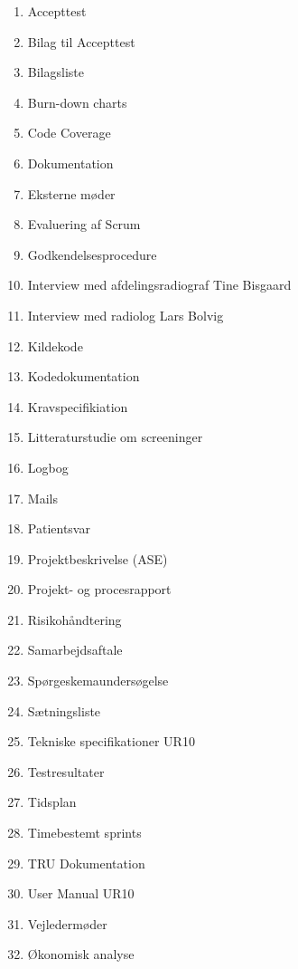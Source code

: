 \begin{enumerate}
\item Accepttest 					 					\label{Accepttest}
\item Bilag til Accepttest								\label{BilagAccepttest}
\item Bilagsliste								\label{Bilagsliste}
\item Burn-down charts									\label{BurnDown}
\item Code Coverage 									\label{Code Coverage}
\item Dokumentation 							\label{Udviklingsdokument}
\item Eksterne møder									\label{Eksterne moder} 
\item Evaluering af Scrum 								\label{Evaluering Scrum} 
\item Godkendelsesprocedure 							\label{Godkendelsesprocedure}
\item Interview med afdelingsradiograf Tine Bisgaard 	\label{Tine}
\item Interview med radiolog Lars Bolvig  				\label{Telefoninterview}
\item Kildekode											\label{Kildekode}
\item Kodedokumentation 								\label{Kodedokumentation} 
\item Kravspecifikiation 								\label{Kravspecifikation}
\item Litteraturstudie om screeninger						\label{Litteraturstudie}
\item Logbog											\label{Logbog}
\item Mails												\label{Mails}
\item Patientsvar										\label{Patientsvar} 
\item Projektbeskrivelse (ASE) 							\label{Projektbeskrivelse}
\item Projekt- og procesrapport 						\label{Projekt- og procesrapport}
\item Risikohåndtering 									\label{Risikohandtering} 
\item Samarbejdsaftale									\label{Samarbejdsaftale} 
\item Spørgeskemaundersøgelse 							\label{Sporgeskemaundersogelse}
\item Sætningsliste 									\label{Satningsliste}
\item Tekniske specifikationer UR10						\label{UR10spec}
\item Testresultater 									\label{TestResultater}
\item Tidsplan											\label{Tidsplan}
\item Timebestemt sprints 								\label{Timebestemt sprints}
\item TRU Dokumentation 								\label{TRUDokumentation}
\item User Manual UR10 									\label{UserManualUR10}
\item Vejledermøder										\label{Vejledermoder}
\item Økonomisk analyse					\label{Okonomi}
\end{enumerate}



